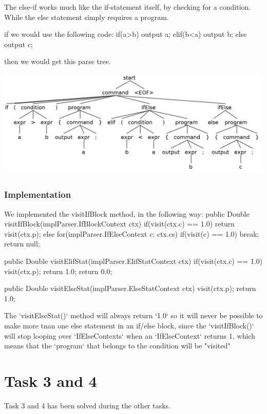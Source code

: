 \documentclass[a4paper]{article}
\newenvironment{code}%
   {\snugshade\verbatim}%
   {\endverbatim\endsnugshade}
\begin{document}
The else-if works much like the if-statement itself, by checking for a condition. While the else statement simply requires a program.

if we would use the following code:
\begin{code}
if(a>b){
    output a;
} elif(b<a){
    output b;
} else {
    output c;
}
\end{code}

then we would get this parse tree.

\begin{center}
  \includegraphics[width=.8\textwidth]{task2-4.png}
\end{center}

  
\subsubsection{Implementation}
We implemented the visitIfBlock method, in the following way:
\begin{code}
public Double visitIfBlock(implParser.IfBlockContext ctx){
    if(visit(ctx.c) == 1.0)
        return visit(ctx.p);
    else
        for(implParser.IfElseContext c: ctx.cs)
            if(visit(c) == 1.0) break;
    return null;
}
\end{code}

\begin{code}
public Double visitElifStat(implParser.ElifStatContext ctx){
    if(visit(ctx.c) == 1.0){
        visit(ctx.p);
        return 1.0;
    }
    return 0.0;
}
\end{code}

\begin{code}
public Double visitElseStat(implParser.ElseStatContext ctx){
    visit(ctx.p);
    return 1.0;
}
\end{code}

The `visitElseStat()` method will always return `1.0` so it will never be possible to make more tnan one else statement in an if/else block, since the `visitIfBlock()` will stop looping over `IfElseContexts` when an `IfElseContext` returns 1, which means that the `program` that belongs to the condition will be "visited"

\section{Task 3 and 4}
Task 3 and 4 has been solved during the other tasks.
\end{document}
